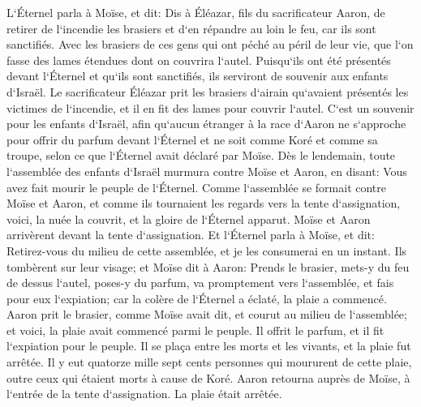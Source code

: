 \verse L`Éternel parla à Moïse, et dit: 
\verse Dis à Éléazar, fils du sacrificateur Aaron, de retirer de l`incendie les brasiers et d`en répandre au loin le feu, car ils sont sanctifiés. 
\verse Avec les brasiers de ces gens qui ont péché au péril de leur vie, que l`on fasse des lames étendues dont on couvrira l`autel. Puisqu`ils ont été présentés devant l`Éternel et qu`ils sont sanctifiés, ils serviront de souvenir aux enfants d`Israël. 
\verse Le sacrificateur Éléazar prit les brasiers d`airain qu`avaient présentés les victimes de l`incendie, et il en fit des lames pour couvrir l`autel. 
\verse C`est un souvenir pour les enfants d`Israël, afin qu`aucun étranger à la race d`Aaron ne s`approche pour offrir du parfum devant l`Éternel et ne soit comme Koré et comme sa troupe, selon ce que l`Éternel avait déclaré par Moïse. 
\verse Dès le lendemain, toute l`assemblée des enfants d`Israël murmura contre Moïse et Aaron, en disant: Vous avez fait mourir le peuple de l`Éternel. 
\verse Comme l`assemblée se formait contre Moïse et Aaron, et comme ils tournaient les regards vers la tente d`assignation, voici, la nuée la couvrit, et la gloire de l`Éternel apparut. 
\verse Moïse et Aaron arrivèrent devant la tente d`assignation. 
\verse Et l`Éternel parla à Moïse, et dit: 
\verse Retirez-vous du milieu de cette assemblée, et je les consumerai en un instant. Ils tombèrent sur leur visage; 
\verse et Moïse dit à Aaron: Prends le brasier, mets-y du feu de dessus l`autel, poses-y du parfum, va promptement vers l`assemblée, et fais pour eux l`expiation; car la colère de l`Éternel a éclaté, la plaie a commencé. 
\verse Aaron prit le brasier, comme Moïse avait dit, et courut au milieu de l`assemblée; et voici, la plaie avait commencé parmi le peuple. Il offrit le parfum, et il fit l`expiation pour le peuple. 
\verse Il se plaça entre les morts et les vivants, et la plaie fut arrêtée. 
\verse Il y eut quatorze mille sept cents personnes qui moururent de cette plaie, outre ceux qui étaient morts à cause de Koré. 
\verse Aaron retourna auprès de Moïse, à l`entrée de la tente d`assignation. La plaie était arrêtée. 

